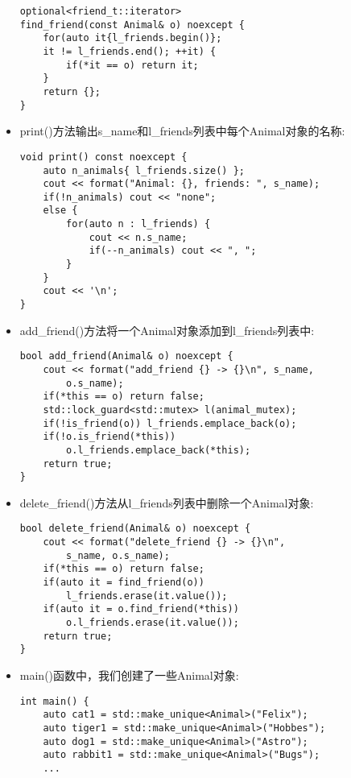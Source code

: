 \begin{itemize}
\begin{lstlisting}[style=styleCXX]
optional<friend_t::iterator>
find_friend(const Animal& o) noexcept {
	for(auto it{l_friends.begin()};
	it != l_friends.end(); ++it) {
		if(*it == o) return it;
	}
	return {};
}
\end{lstlisting}

\item 
print()方法输出s\_name和l\_friends列表中每个Animal对象的名称:

\begin{lstlisting}[style=styleCXX]
void print() const noexcept {
	auto n_animals{ l_friends.size() };
	cout << format("Animal: {}, friends: ", s_name);
	if(!n_animals) cout << "none";
	else {
		for(auto n : l_friends) {
			cout << n.s_name;
			if(--n_animals) cout << ", ";
		}
	}
	cout << '\n';
}
\end{lstlisting}

\item 
add\_friend()方法将一个Animal对象添加到l\_friends列表中:

\begin{lstlisting}[style=styleCXX]
bool add_friend(Animal& o) noexcept {
	cout << format("add_friend {} -> {}\n", s_name,
		o.s_name);
	if(*this == o) return false;
	std::lock_guard<std::mutex> l(animal_mutex);
	if(!is_friend(o)) l_friends.emplace_back(o);
	if(!o.is_friend(*this))
		o.l_friends.emplace_back(*this);
	return true;
}
\end{lstlisting}

\item 
delete\_friend()方法从l\_friends列表中删除一个Animal对象:

\begin{lstlisting}[style=styleCXX]
bool delete_friend(Animal& o) noexcept {
	cout << format("delete_friend {} -> {}\n",
		s_name, o.s_name);
	if(*this == o) return false;
	if(auto it = find_friend(o))
		l_friends.erase(it.value());
	if(auto it = o.find_friend(*this))
		o.l_friends.erase(it.value());
	return true;
}
\end{lstlisting}

\item 
main()函数中，我们创建了一些Animal对象:

\begin{lstlisting}[style=styleCXX]
int main() {
	auto cat1 = std::make_unique<Animal>("Felix");
	auto tiger1 = std::make_unique<Animal>("Hobbes");
	auto dog1 = std::make_unique<Animal>("Astro");
	auto rabbit1 = std::make_unique<Animal>("Bugs");
	...
\end{lstlisting}


\end{itemize}
